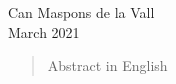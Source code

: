 \documentclass[12pt,a4paper,twoside,fleqn]{memoir}
\begin{document}
\begin{flushright}
Can Maspons de la Vall\\
March 2021
\end{flushright}

\cleartoverso %


\begin{abstract}

Abstract in English
% 
% 

\end{abstract}
\end{document}
